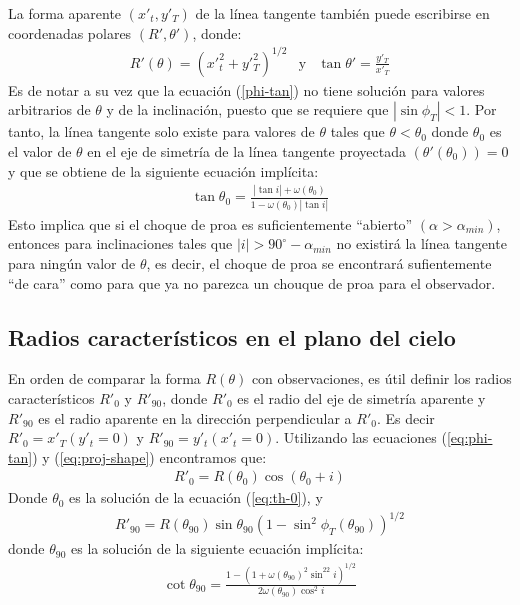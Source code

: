 La forma aparente $(x'_t, y'_T)$  de la línea tangente también puede escribirse
en coordenadas polares $(R', \theta')$, donde:
\begin{align}
  R'(\theta) = \left(x'_t^2 + y'_T^2\right)^{1/2} & \mathrm{y} & \tan\theta' = \frac{y'_T}{x'_T}
  \label{eq:polar}
\end{align}
Es de notar a su vez que la ecuación (\ref{phi-tan}) no tiene solución para valores
arbitrarios de $\theta$ y de la inclinación, puesto que se requiere que
$\left|\sin\phi_T\right| < 1$. Por tanto, la línea tangente solo existe para valores
de $\theta$ tales que $\theta < \theta_0$ donde $\theta_0$ es el valor de $\theta$ en
el eje de simetría de la línea tangente proyectada $(\theta'(\theta_0)) = 0$ y que se
obtiene de la siguiente ecuación implícita:
\begin{align}
  \tan\theta_0 = \frac{|\tan i| + \omega(\theta_0)}{1 - \omega(\theta_0)|\tan i|}
  \label{eq:th-0}
\end{align}
Esto implica que si el choque de proa es suficientemente ``abierto''
$(\alpha > \alpha_{min})$, entonces para inclinaciones tales que
$|i| > 90^\circ - \alpha_{min}$ no existirá la línea tangente para ningún valor de $\theta$,
es decir, el choque de proa se encontrará sufientemente ``de cara'' como para que ya no
parezca un chouque de proa para el observador.

\subsection{Radios característicos en el plano del cielo}

En orden de comparar la forma $R(\theta)$ con observaciones, es útil definir los radios
característicos $R'_0$ y $R'_{90}$, donde $R'_0$ es el radio del eje de simetría aparente
y $R'_{90}$ es el radio aparente en la dirección perpendicular a $R'_0$. Es decir
$R'_0 = x'_T(y'_t=0)$ y $R'_{90} = y'_t(x'_t = 0)$. Utilizando las ecuaciones
(\ref{eq:phi-tan}) y (\ref{eq:proj-shape}) encontramos que:
\begin{align}
R'_0 = R(\theta_0)\cos(\theta_0 + i)
\label{eq:R0p}
\end{align}
Donde $\theta_0$ es la solución de la ecuación (\ref{eq:th-0}), y
\begin{align}
  R'_{90} = R(\theta_{90})\sin\theta_{90}\left(1-\sin^2\phi_T(\theta_{90})\right)^{1/2}
  \label{eq:R90p}
\end{align}
donde $\theta_{90}$ es la solución de la siguiente ecuación implícita:
\begin{align}
  \cot\theta_{90} = \frac{1 - \left(1+\omega(\theta_{90})^2\sin^22i\right)^{1/2}}
  {2\omega(\theta_{90})\cos^2i}
  \label{eq:th90}
\end{align}

